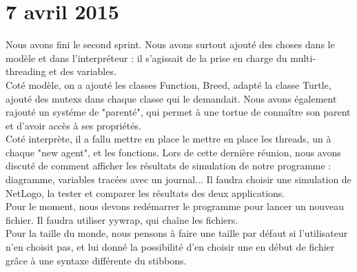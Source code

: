 \section{7 avril 2015}
Nous avons fini le second sprint. Nous avons surtout ajouté des choses dans le modèle et dans l'interpréteur :
il s'agissait de la prise en charge du multi-threading et des variables.\\
Coté modèle, on a ajouté les classes Function, Breed, adapté la classe Turtle, ajouté des mutexs dans chaque classe qui le demandait.
Nous avons également rajouté un systéme de "parenté", qui permet à une tortue de connaître son parent et d'avoir accès à ses propriétés.\\
Coté interprète, il a fallu mettre en place le mettre en place les threads, un à chaque "new agent", et les fonctions.
Lors de cette dernière réunion, nous avons discuté de comment afficher les résultats de simulation de notre programme : diagramme, variables tracées avec un journal... Il faudra choisir une simulation de NetLogo, la tester et comparer les résultats des deux applications.\\
Pour le moment, nous devons redémarrer le programme pour lancer un nouveau fichier. Il faudra utiliser yywrap, qui chaîne les fichiers.\\
Pour la taille du monde, nous pensons à faire une taille par défaut si l'utilisateur n'en choisit pas, et lui donné la possibilité d'en choisir une en début de fichier grâce à une syntaxe différente du stibbons.
